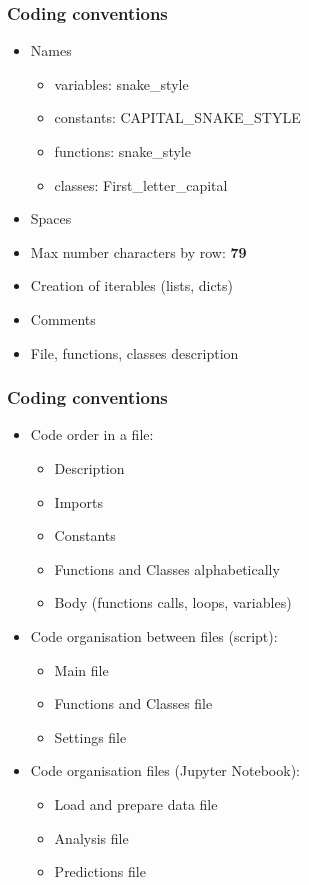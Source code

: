 \begin{frame}\frametitle{Coding conventions}
   \begin{itemize}
      \item Names
      \begin{itemize}
         \item variables: snake\_style
         \item constants: CAPITAL\_SNAKE\_STYLE
         \item functions: snake\_style
         \item classes: First\_letter\_capital
      \end{itemize}
      \item Spaces
      \item Max number characters by row: \textbf{79}
      \item Creation of iterables (lists, dicts)
      \item Comments
      \item File, functions, classes description
   \end{itemize}
\end{frame}


\begin{frame}\frametitle{Coding conventions}
   \begin{itemize}
      \item Code order in a file:
      \begin{itemize}
         \item Description
         \item Imports
         \item Constants
         \item Functions and Classes alphabetically
         \item Body (functions calls, loops, variables)
      \end{itemize}
      \item Code organisation between files (script):
      \begin{itemize}
         \item Main file
         \item Functions and Classes file
         \item Settings file
      \end{itemize}
      \item Code organisation files (Jupyter Notebook):
      \begin{itemize}
         \item Load and prepare data file
         \item Analysis file
         \item Predictions file
      \end{itemize}
   \end{itemize}
\end{frame}

